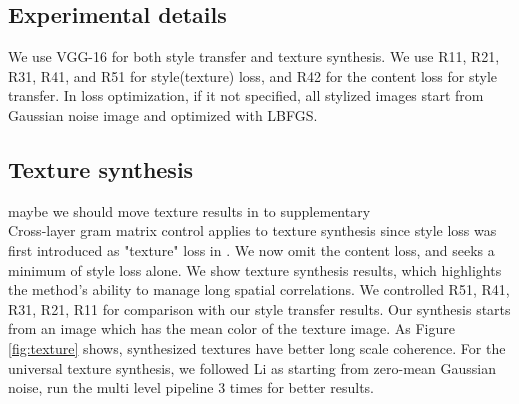 \documentclass[runningheads]{llncs}
\begin{document}
\subsection{Experimental details}
We use VGG-16 for both style transfer and texture synthesis.  We use R11, R21, R31, R41, and R51 for style(texture) loss, and R42 for the content loss for style transfer. In loss optimization, if it not specified, all stylized images start from Gaussian noise image and optimized with LBFGS.\\


\subsection{Texture synthesis} 
\todo maybe we should move texture results in to supplementary\\

Cross-layer gram matrix control applies to texture synthesis since style loss \cite{gatys2016image} was first introduced as "texture" loss in \cite{NIPS2015_5633}.  We now omit the content loss, and seeks a minimum of style loss alone.  We show texture synthesis results, which highlights the method's ability to manage long spatial correlations.  We controlled R51, R41, R31, R21, R11 for comparison with our style transfer results.  Our synthesis starts from an image which has the mean color of the texture image. 
As Figure \ref{fig:texture} shows, synthesized textures have better long scale coherence.    For the universal texture synthesis, we followed Li \ea  as starting from zero-mean Gaussian noise, run the multi level pipeline 3 times for better results.
\end{document}
